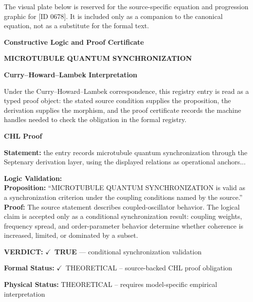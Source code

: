 \begingroup\footnotesize\sloppy
The visual plate below is reserved for the source-specific equation and progression graphic for [ID 0678]. It is included only as a companion to the canonical equation, not as a substitute for the formal text.
\par\endgroup
\ifTZPDarkEdition
{}
\fi

\clearpage
\begingroup\tzpsupportsetup
\noindent\textbf{\fontsize{10.8pt}{12.8pt}\selectfont [ID 0678] Constructive Logic and Proof Certificate}\par
\noindent\textbf{\fontsize{10pt}{12pt}\selectfont MICROTUBULE QUANTUM SYNCHRONIZATION}\par
\vspace{0.45em}
\begingroup
\footnotesize
\setlength{\parskip}{0.22em}
\setlength{\parindent}{0pt}
\noindent\textbf{Curry--Howard--Lambek Interpretation}\par
Under the Curry--Howard--Lambek correspondence, this registry entry is read as a typed proof
object: the stated source condition supplies the proposition, the derivation supplies the
morphism, and the proof certificate records the machine handles needed to check the obligation
in the formal registry.

\vspace{0.45em}
\noindent\textbf{CHL Proof}\par
\textbf{Statement:} the entry records microtubule quantum synchronization through the Septenary derivation
layer, using the displayed relations as operational anchors...

\textbf{Logic Validation:}\\
\textbf{Proposition:} ``MICROTUBULE QUANTUM SYNCHRONIZATION is valid as a synchronization criterion under the
coupling conditions named by the source.''\\
\textbf{Proof:} The source statement describes coupled-oscillator behavior. The logical claim is
accepted only as a conditional synchronization result: coupling weights, frequency
spread, and order-parameter behavior determine whether coherence is increased, limited,
or dominated by a subset.

\textbf{VERDICT:} \ensuremath{\checkmark}\ \textbf{TRUE} --- conditional synchronization validation

\textbf{Formal Status:} \ensuremath{\checkmark}\ THEORETICAL -- source-backed CHL proof obligation

\textbf{Physical Status:} THEORETICAL -- requires model-specific empirical interpretation
\par\vspace{0.45em}
\par
\ifTZPDarkEdition
{}
\fi
\endgroup
\endgroup
